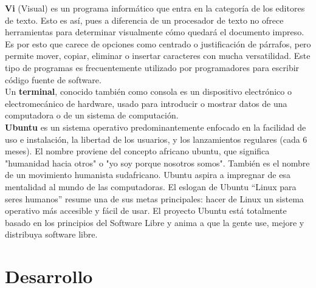 \documentclass[12pt]{article}
\begin{document}
{\bf Vi} (Visual) es un programa informático que entra en la categoría de los editores de texto. Esto es así, pues a diferencia de un procesador de texto no ofrece herramientas para determinar visualmente cómo quedará el documento impreso. Es por esto que carece de opciones como centrado o justificación de párrafos, pero permite mover, copiar, eliminar o insertar caracteres con mucha versatilidad. Este tipo de programas es frecuentemente utilizado por programadores para escribir código fuente de software.\\

Un {\bf terminal}, conocido también como consola es un dispositivo electrónico o electromecánico de hardware, usado para introducir o mostrar datos de una computadora o de un sistema de computación.\\

{\bf Ubuntu} es un sistema operativo predominantemente enfocado en la facilidad de uso e instalación, la libertad de los usuarios, y los lanzamientos regulares (cada 6 meses). El nombre proviene del concepto africano ubuntu, que significa "humanidad hacia otros" o "yo soy porque nosotros somos". También es el nombre de un movimiento humanista sudafricano. Ubuntu aspira a impregnar de esa mentalidad al mundo de las computadoras. El eslogan de Ubuntu “Linux para seres humanos” resume una de sus metas principales: hacer de Linux un sistema operativo más accesible y fácil de usar. El proyecto Ubuntu está totalmente basado en los principios del Software Libre y anima a que la gente use, mejore y distribuya software libre.

\section{Desarrollo}
\end{document}
